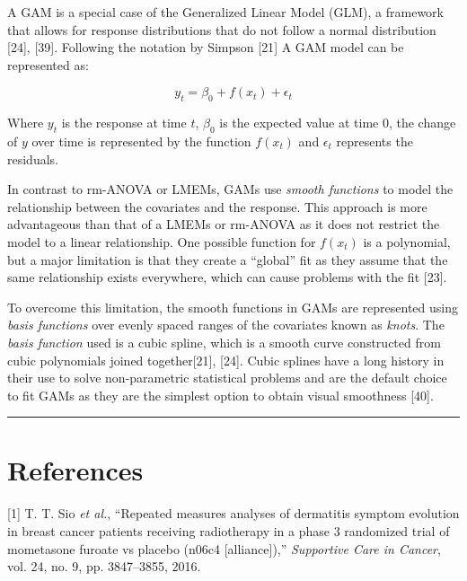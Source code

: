 \documentclass[
]{article}
\begin{document}
A GAM is a special case of the Generalized Linear Model (GLM), a framework that allows for response distributions that do not follow a normal distribution {[}24{]}, {[}39{]}. Following the notation by Simpson {[}21{]} A GAM model can be represented as:

\begin{equation}
  y_{t}=\beta_0+f(x_t)+\epsilon_t  
  \label{eq:GAM}
\end{equation}

Where \(y_t\) is the response at time \(t\), \(\beta_0\) is the expected value at time 0, the change of \(y\) over time is represented by the function \(f(x_t)\) and \(\epsilon_t\) represents the residuals.

In contrast to rm-ANOVA or LMEMs, GAMs use \emph{smooth functions} to model the relationship between the covariates and the response. This approach is more advantageous than that of a LMEMs or rm-ANOVA as it does not restrict the model to a linear relationship. One possible function for \(f(x_t)\) is a polynomial, but a major limitation is that they create a ``global'' fit as they assume that the same relationship exists everywhere, which can cause problems with the fit {[}23{]}.

To overcome this limitation, the smooth functions in GAMs are represented using \emph{basis functions} over evenly spaced ranges of the covariates known as \emph{knots}. The \emph{basis function} used is a cubic spline, which is a smooth curve constructed from cubic polynomials joined together{[}21{]}, {[}24{]}. Cubic splines have a long history in their use to solve non-parametric statistical problems and are the default choice to fit GAMs as they are the simplest option to obtain visual smoothness {[}40{]}.

\begin{center}\rule{0.5\linewidth}{0.5pt}\end{center}

\hypertarget{references}{%
\section*{References}\label{references}}

\hypertarget{refs}{}
\leavevmode\hypertarget{ref-sio2016}{}%
{[}1{]} T. T. Sio \emph{et al.}, ``Repeated measures analyses of dermatitis symptom evolution in breast cancer patients receiving radiotherapy in a phase 3 randomized trial of mometasone furoate vs placebo (n06c4 {[}alliance{]}),'' \emph{Supportive Care in Cancer}, vol. 24, no. 9, pp. 3847--3855, 2016.
\end{document}
